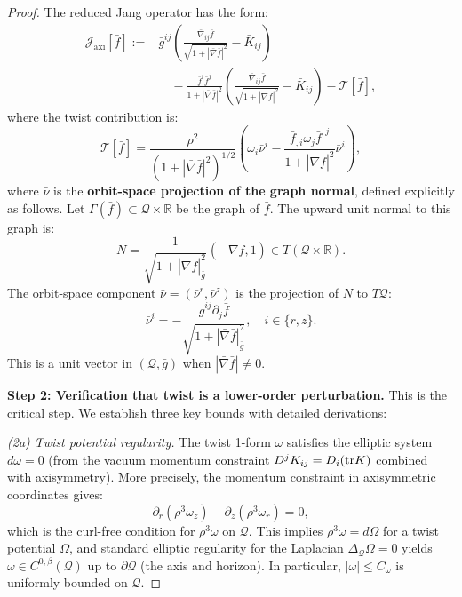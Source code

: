 \begin{proof}
The reduced Jang operator has the form:
\[
\begin{aligned}
\mathcal{J}_{\text{axi}}[\bar{f}]
:={}& \bar{g}^{ij}\left(
        \frac{\bar{\nabla}_{ij}\bar{f}}{\sqrt{1+|\bar{\nabla}\bar{f}|^2}}
        - \bar{K}_{ij}
     \right) \\
&\quad - \frac{\bar{f}^i\bar{f}^j}{1+|\bar{\nabla}\bar{f}|^2}
     \left(
        \frac{\bar{\nabla}_{ij}\bar{f}}{\sqrt{1+|\bar{\nabla}\bar{f}|^2}}
        - \bar{K}_{ij}
     \right)
     - \mathcal{T}[\bar{f}],
\end{aligned}
\]
where the twist contribution is:
\begin{equation}\label{eq:twist-term}
\mathcal{T}[\bar{f}]
= \frac{\rho^2}{(1 + |\bar{\nabla} \bar{f}|^2)^{1/2}}
  \left(
      \omega_i \bar{\nu}^i
      - \frac{\bar{f}_{,i}\omega_j \bar{f}^{,j}}{1 + |\bar{\nabla} \bar{f}|^2}\bar{\nu}^i
  \right),
\end{equation}
where $\bar{\nu}$ is the \textbf{orbit-space projection of the graph normal}, defined explicitly as follows. Let $\Gamma(\bar{f}) \subset \mathcal{Q} \times \mathbb{R}$ be the graph of $\bar{f}$. The upward unit normal to this graph is:
\[
N = \frac{1}{\sqrt{1 + |\bar{\nabla}\bar{f}|^2_{\bar{g}}}}(-\bar{\nabla}\bar{f}, 1) \in T(\mathcal{Q} \times \mathbb{R}).
\]
The orbit-space component $\bar{\nu} = (\bar{\nu}^r, \bar{\nu}^z)$ is the projection of $N$ to $T\mathcal{Q}$:
\[
\bar{\nu}^i = -\frac{\bar{g}^{ij}\partial_j \bar{f}}{\sqrt{1 + |\bar{\nabla}\bar{f}|^2_{\bar{g}}}}, \quad i \in \{r, z\}.
\]
This is a unit vector in $(\mathcal{Q}, \bar{g})$ when $|\bar{\nabla}\bar{f}| \neq 0$.

\textbf{Step 2: Verification that twist is a lower-order perturbation.}
This is the critical step. We establish three key bounds with detailed derivations:

\textit{(2a) Twist potential regularity.} The twist 1-form $\omega$ satisfies the elliptic system $d\omega = 0$ (from the vacuum momentum constraint $D^j K_{ij} = D_i(\mathrm{tr} K)$ combined with axisymmetry). More precisely, the momentum constraint in axisymmetric coordinates gives:
\[
\partial_r(\rho^3 \omega_z) - \partial_z(\rho^3 \omega_r) = 0,
\]
which is the curl-free condition for $\rho^3 \omega$ on $\mathcal{Q}$. This implies $\rho^3 \omega = d\Omega$ for a twist potential $\Omega$, and standard elliptic regularity for the Laplacian $\Delta_{\mathcal{Q}} \Omega = 0$ \cite{gilbargtrudinger2001} yields $\omega \in C^{0,\beta}(\mathcal{Q})$ up to $\partial\mathcal{Q}$ (the axis and horizon). In particular, $|\omega| \leq C_\omega$ is uniformly bounded on $\mathcal{Q}$.


\end{proof}
